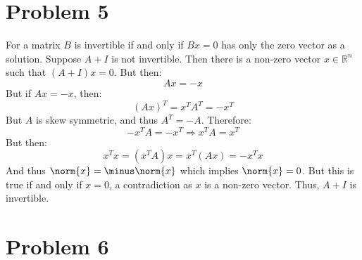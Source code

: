 \documentclass[crop=false,class=article]{standalone}                           %
\begin{document}
    \section*{Problem 5}
        For a matrix $B$ is invertible if and only if $Bx=0$ has only the zero
        vector as a solution. Suppose $A+I$ is not invertible. Then there is a
        non-zero vector $x\in\mathbb{R}^{n}$ such that $(A+I)x=0$. But then:
        \begin{equation}
            Ax=\minus{x}
        \end{equation}
        But if $Ax=\minus{x}$, then:
        \begin{equation}
            (Ax)^{T}=x^{T}A^{T}=\minus{x}^{T}
        \end{equation}
        But $A$ is skew symmetric, and thus $A^{T}=\minus{A}$. Therefore:
        \begin{equation}
            \minus{x}^{T}A=\minus{x}^{T}
            \Longrightarrow
            x^{T}A=x^{T}
        \end{equation}
        But then:
        \begin{equation}
            x^{T}x=(x^{T}A)x=x^{T}(Ax)=\minus{x}^{T}x
        \end{equation}
        And thus $\norm{x}=\minus\norm{x}$ which implies $\norm{x}=0$. But this
        is true if and only if $x=0$, a contradiction as $x$ is a non-zero
        vector. Thus, $A+I$ is invertible.
    \section*{Problem 6}
\end{document}
